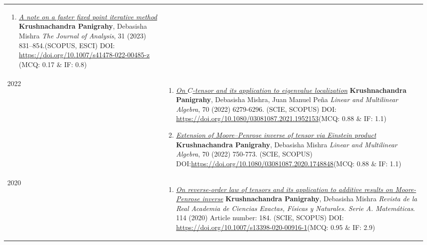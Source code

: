 \documentclass[a4paper,12pt]{article}
\begin{document}
\begin{longtable}{lp{15cm}}
\begin{enumerate}[resume=pubs]
\item \href{https://doi.org/10.1007/s41478-022-00485-z}{\it A note on a faster fixed point iterative method}\newline
{\footnotesize
{\bf Krushnachandra Panigrahy}, Debasisha Mishra \newline
\textcolor{source}{\it The Journal of Analysis}, 31 (2023) 831–854.\hfill{(SCOPUS, ESCI)}\newline
DOI: \href{https://doi.org/10.1007/s41478-022-00485-z}{https://doi.org/10.1007/s41478-022-00485-z} \hfill(MCQ: 0.17 $\&$ IF: 0.8)
}
\end{enumerate}\\
\textsc{2022}&
\vspace{-0.3cm}
\begin{enumerate}[resume=pubs]
\item \href{https://doi.org/10.1080/03081087.2021.1952153}{\it On $C$-tensor and its application to eigenvalue localization}\newline
{\footnotesize
{\bf Krushnachandra Panigrahy}, Debasisha Mishra, Juan Manuel Pe\~na\newline
\textcolor{source}{\it Linear and Multilinear Algebra}, 70 (2022) 6279-6296. \hfill{(SCIE, SCOPUS)}\newline
DOI: \href{https://doi.org/10.1080/03081087.2021.1952153}{https://doi.org/10.1080/03081087.2021.1952153}\hfill(MCQ: 0.88 $\&$ IF: 1.1)
}
\item \href{https://doi.org/10.1080/03081087.2020.1748848}{\it Extension of Moore--Penrose inverse of tensor via Einstein product}\newline
{\footnotesize
{\bf Krushnachandra Panigrahy}, Debasisha Mishra\newline
\textcolor{source}{\it Linear and Multilinear Algebra}, 
70 (2022) 750-773. \hfill{(SCIE, SCOPUS)}
DOI:\href{https://doi.org/10.1080/03081087.2020.1748848}{https://doi.org/10.1080/03081087.2020.1748848}\hfill(MCQ: 0.88 $\&$ IF: 1.1)
}
\end{enumerate}\\
\textsc{2020}&
\vspace{-0.3cm}
\begin{enumerate}[resume=pubs]
\item \href{https://doi.org/10.1007/s13398-020-00916-1}{\it On reverse-order law of tensors and its application to additive results on Moore-Penrose inverse}\newline
{\footnotesize{\bf Krushnachandra Panigrahy},  Debasisha Mishra\newline
\textcolor{source}{\it Revista de la Real Academia de Ciencias Exactas, F\'isicas y Naturales. Serie A. Matem\'aticas}. 114 (2020) Article number: 184. \hfill{(SCIE, SCOPUS)}\newline
DOI: \href{https://doi.org/10.1007/s13398-020-00916-1}{https://doi.org/10.1007/s13398-020-00916-1}\hfill(MCQ: 0.95 $\&$ IF: 2.9)
}


\end{enumerate}
\end{longtable}
\end{document}
